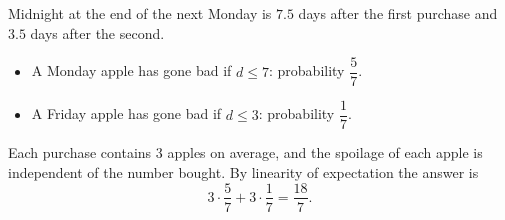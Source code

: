Midnight at the end of the next Monday is $7.5$ days after the first purchase and $3.5$ days after the second.
\begin{itemize}
\item A Monday apple has gone bad if $d\le7$: probability $\dfrac57$.
\item A Friday apple has gone bad if $d\le3$: probability $\dfrac17$.
\end{itemize}
Each purchase contains $3$ apples on average, and the spoilage of each apple is independent of the number bought. By linearity of expectation the answer is
\[3\cdot\dfrac57+3\cdot\dfrac17=\boxed{\dfrac{18}{7}}.\]
